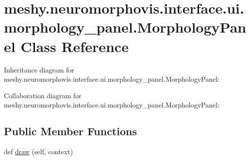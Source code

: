 \hypertarget{classmeshy_1_1neuromorphovis_1_1interface_1_1ui_1_1morphology__panel_1_1MorphologyPanel}{}\section{meshy.\+neuromorphovis.\+interface.\+ui.\+morphology\+\_\+panel.\+Morphology\+Panel Class Reference}
\label{classmeshy_1_1neuromorphovis_1_1interface_1_1ui_1_1morphology__panel_1_1MorphologyPanel}


 




Inheritance diagram for meshy.\+neuromorphovis.\+interface.\+ui.\+morphology\+\_\+panel.\+Morphology\+Panel\+:


Collaboration diagram for meshy.\+neuromorphovis.\+interface.\+ui.\+morphology\+\_\+panel.\+Morphology\+Panel\+:
\subsection*{Public Member Functions}
\begin{DoxyCompactItemize}
\item 
def \hyperlink{classmeshy_1_1neuromorphovis_1_1interface_1_1ui_1_1morphology__panel_1_1MorphologyPanel_a3cf176610d13176ceebb3c942880ae2c}{draw} (self, context)
\end{DoxyCompactItemize}
